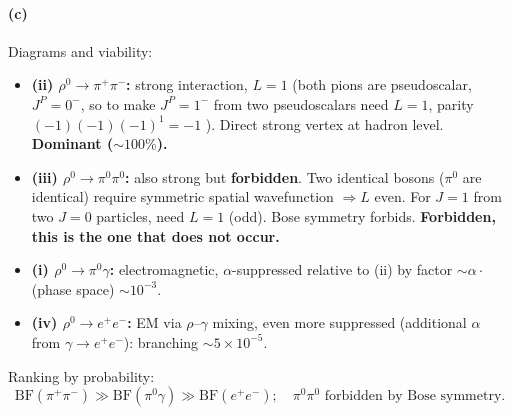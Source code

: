 \documentclass[11pt]{article}
\begin{document}
\paragraph{(c)} Diagrams and viability:

\begin{itemize}[itemsep=2pt]
\item \textbf{(ii) $\rho^0\to\pi^+\pi^-$:} strong interaction, $L=1$ (both pions are pseudoscalar, $J^P=0^-$, so to make $J^P=1^-$ from two pseudoscalars need $L=1$, parity $(-1)(-1)(-1)^{1}=-1$ \checkmark). Direct strong vertex at hadron level. \textbf{Dominant ($\sim 100\%$).}
\item \textbf{(iii) $\rho^0\to\pi^0\pi^0$:} also strong but \textbf{forbidden}. Two identical bosons ($\pi^0$ are identical) require symmetric spatial wavefunction $\Rightarrow L$ even. For $J=1$ from two $J=0$ particles, need $L=1$ (odd). Bose symmetry forbids. \textbf{Forbidden, this is the one that does not occur.}
\item \textbf{(i) $\rho^0\to\pi^0\gamma$:} electromagnetic, $\alpha$-suppressed relative to (ii) by factor $\sim\alpha\cdot$(phase space) $\sim 10^{-3}$.
\item \textbf{(iv) $\rho^0\to e^+e^-$:} EM via $\rho$--$\gamma$ mixing, even more suppressed (additional $\alpha$ from $\gamma\to e^+e^-$): branching $\sim 5\times 10^{-5}$.
\end{itemize}

Ranking by probability:
\[
\boxed{\;\mathrm{BF}(\pi^+\pi^-)\gg \mathrm{BF}(\pi^0\gamma)\gg \mathrm{BF}(e^+e^-);\quad \pi^0\pi^0\text{ forbidden by Bose symmetry}.\;}
\]

\begin{center}
\end{center}
\end{document}
